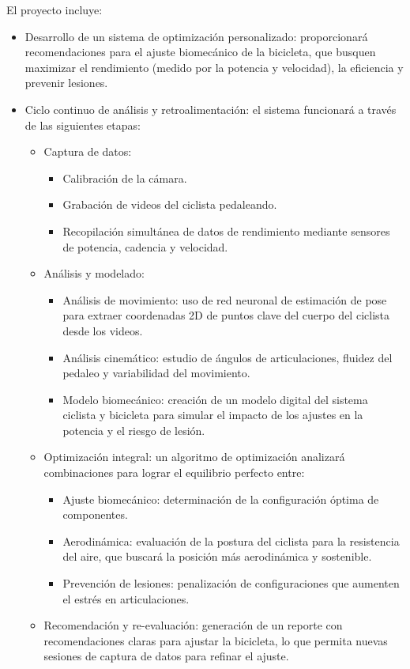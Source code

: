 \documentclass[
11pt, %
]{charter}
\begin{document}
El proyecto incluye:
\begin{itemize}
\item Desarrollo de un sistema de optimización personalizado: proporcionará recomendaciones para el ajuste biomecánico de la bicicleta, que busquen maximizar el rendimiento (medido por la potencia y velocidad), la eficiencia y prevenir lesiones.

\item Ciclo continuo de análisis y retroalimentación: el sistema funcionará a través de las siguientes etapas:
    \begin{itemize}
        \item Captura de datos:
            \begin{itemize}
             	\item Calibración de la cámara.
                \item Grabación de videos del ciclista pedaleando.
                \item Recopilación simultánea de datos de rendimiento mediante sensores de potencia, cadencia y velocidad.
            \end{itemize}
        \item Análisis y modelado:
            \begin{itemize}
                \item Análisis de movimiento: uso de red neuronal de estimación de pose para extraer coordenadas 2D de puntos clave del cuerpo del ciclista desde los videos.
                \item Análisis cinemático: estudio de ángulos de articulaciones, fluidez del pedaleo y variabilidad del movimiento.
                \item Modelo biomecánico: creación de un modelo digital del sistema ciclista y bicicleta para simular el impacto de los ajustes en la potencia y el riesgo de lesión.
            \end{itemize}
        \item Optimización integral: un algoritmo de optimización analizará combinaciones para lograr el equilibrio perfecto entre:
            \begin{itemize}
                \item Ajuste biomecánico: determinación de la configuración óptima de componentes.
                \item Aerodinámica: evaluación de la postura del ciclista para la resistencia del aire, que buscará la posición más aerodinámica y sostenible.
                \item Prevención de lesiones: penalización de configuraciones que aumenten el estrés en articulaciones.
            \end{itemize}
        \item Recomendación y re-evaluación: generación de un reporte con recomendaciones claras para ajustar la bicicleta, lo que permita nuevas sesiones de captura de datos para refinar el ajuste.
    \end{itemize}


\end{itemize}
\end{document}
